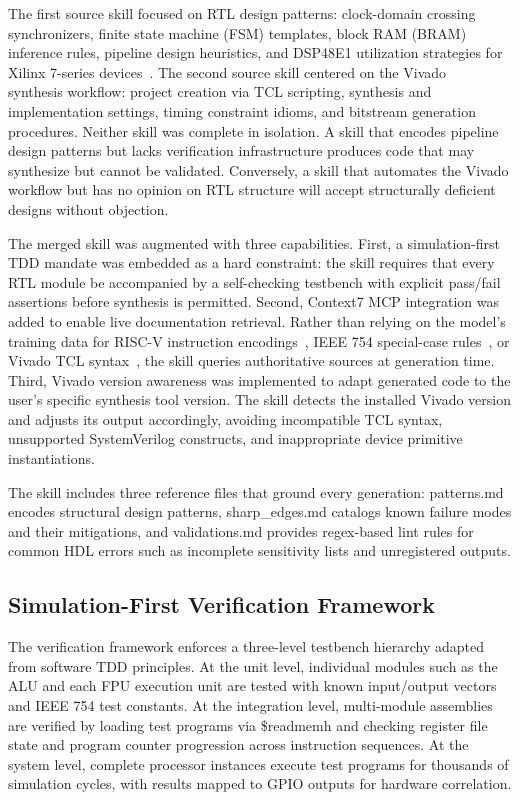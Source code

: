 \documentclass[journal]{IEEEtran}
\begin{document}
The first source skill focused on RTL design patterns: clock-domain crossing synchronizers, finite state machine (FSM) templates, block RAM (BRAM) inference rules, pipeline design heuristics, and DSP48E1 utilization strategies for Xilinx 7-series devices~\cite{xilinx2020ds180}. The second source skill centered on the Vivado~\cite{xilinx2020ug901} synthesis workflow: project creation via TCL scripting, synthesis and implementation settings, timing constraint idioms, and bitstream generation procedures. Neither skill was complete in isolation. A skill that encodes pipeline design patterns but lacks verification infrastructure produces code that may synthesize but cannot be validated. Conversely, a skill that automates the Vivado workflow but has no opinion on RTL structure will accept structurally deficient designs without objection.

The merged skill was augmented with three capabilities. First, a simulation-first TDD mandate was embedded as a hard constraint: the skill requires that every RTL module be accompanied by a self-checking testbench with explicit pass/fail assertions before synthesis is permitted. Second, Context7 MCP integration was added to enable live documentation retrieval. Rather than relying on the model's training data for RISC-V instruction encodings~\cite{waterman2019riscv}, IEEE 754 special-case rules~\cite{ieee754_2019}, or Vivado TCL syntax~\cite{xilinx2020ug901}, the skill queries authoritative sources at generation time. Third, Vivado version awareness was implemented to adapt generated code to the user's specific synthesis tool version. The skill detects the installed Vivado version and adjusts its output accordingly, avoiding incompatible TCL syntax, unsupported SystemVerilog constructs, and inappropriate device primitive instantiations.

The skill includes three reference files that ground every generation: patterns.md encodes structural design patterns, sharp\_edges.md catalogs known failure modes and their mitigations, and validations.md provides regex-based lint rules for common HDL errors such as incomplete sensitivity lists and unregistered outputs.

\subsection{Simulation-First Verification Framework}

The verification framework enforces a three-level testbench hierarchy adapted from software TDD principles. At the unit level, individual modules such as the ALU and each FPU execution unit are tested with known input/output vectors and IEEE 754 test constants. At the integration level, multi-module assemblies are verified by loading test programs via \$readmemh and checking register file state and program counter progression across instruction sequences. At the system level, complete processor instances execute test programs for thousands of simulation cycles, with results mapped to GPIO outputs for hardware correlation.
\end{document}

